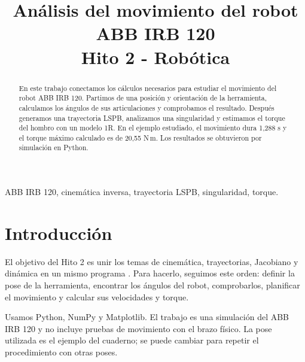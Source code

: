 \documentclass[conference]{IEEEtran}
\begin{document}
\title{Análisis del movimiento del robot ABB IRB 120\\Hito 2 - Robótica}
\author{
}
\maketitle
\begin{abstract}
En este trabajo conectamos los cálculos necesarios para estudiar el movimiento del robot ABB IRB 120. Partimos de una posición y orientación de la herramienta, calculamos los ángulos de sus articulaciones y comprobamos el resultado. Después generamos una trayectoria LSPB, analizamos una singularidad y estimamos el torque del hombro con un modelo 1R. En el ejemplo estudiado, el movimiento dura 1,288 s y el torque máximo calculado es de 20,55 N\,m. Los resultados se obtuvieron por simulación en Python.
\end{abstract}
\begin{IEEEkeywords}
ABB IRB 120, cinemática inversa, trayectoria LSPB, singularidad, torque.
\end{IEEEkeywords}

\section{Introducción}
El objetivo del Hito 2 es unir los temas de cinemática, trayectorias, Jacobiano y dinámica en un mismo programa \cite{guia}. Para hacerlo, seguimos este orden: definir la pose de la herramienta, encontrar los ángulos del robot, comprobarlos, planificar el movimiento y calcular sus velocidades y torque.

Usamos Python, NumPy y Matplotlib. El trabajo es una simulación del ABB IRB 120 y no incluye pruebas de movimiento con el brazo físico. La pose utilizada es el ejemplo del cuaderno; se puede cambiar para repetir el procedimiento con otras poses.
\end{document}

